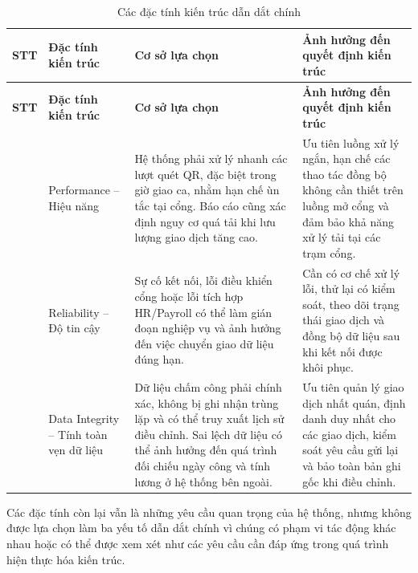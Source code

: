\small
\renewcommand{\arraystretch}{1.3}
\begin{longtable}{|>{\centering\arraybackslash}p{0.7cm}|>{\raggedright\arraybackslash}p{2.6cm}|>{\raggedright\arraybackslash}p{5.8cm}|>{\raggedright\arraybackslash}p{6.0cm}|}
\caption{Các đặc tính kiến trúc dẫn dắt chính}\label{tab:top3} \\
\hline
\textbf{STT} & \textbf{Đặc tính kiến trúc} & \textbf{Cơ sở lựa chọn} & \textbf{Ảnh hưởng đến quyết định kiến trúc} \\
\hline
\endfirsthead
\hline
\textbf{STT} & \textbf{Đặc tính kiến trúc} & \textbf{Cơ sở lựa chọn} & \textbf{Ảnh hưởng đến quyết định kiến trúc} \\
\hline
\endhead
\hline
\endfoot
\hline
\endlastfoot
1 & Performance -- Hiệu năng & Hệ thống phải xử lý nhanh các lượt quét QR, đặc biệt trong giờ giao ca, nhằm hạn chế ùn tắc tại cổng. Báo cáo cũng xác định nguy cơ quá tải khi lưu lượng giao dịch tăng cao. & Ưu tiên luồng xử lý ngắn, hạn chế các thao tác đồng bộ không cần thiết trên luồng mở cổng và đảm bảo khả năng xử lý tải tại các trạm cổng. \\
\hline
2 & Reliability -- Độ tin cậy & Sự cố kết nối, lỗi điều khiển cổng hoặc lỗi tích hợp HR/Payroll có thể làm gián đoạn nghiệp vụ và ảnh hưởng đến việc chuyển giao dữ liệu đúng hạn. & Cần có cơ chế xử lý lỗi, thử lại có kiểm soát, theo dõi trạng thái giao dịch và đồng bộ dữ liệu sau khi kết nối được khôi phục. \\
\hline
3 & Data Integrity -- Tính toàn vẹn dữ liệu & Dữ liệu chấm công phải chính xác, không bị ghi nhận trùng lặp và có thể truy xuất lịch sử điều chỉnh. Sai lệch dữ liệu có thể ảnh hưởng đến quá trình đối chiếu ngày công và tính lương ở hệ thống bên ngoài. & Ưu tiên quản lý giao dịch nhất quán, định danh duy nhất cho các giao dịch, kiểm soát yêu cầu gửi lại và bảo toàn bản ghi gốc khi điều chỉnh. \\
\end{longtable}
\normalsize


Các đặc tính còn lại vẫn là những yêu cầu quan trọng của hệ thống, nhưng không được lựa chọn làm ba yếu tố dẫn dắt chính vì chúng có phạm vi tác động khác nhau hoặc có thể được xem xét như các yêu cầu cần đáp ứng trong quá trình hiện thực hóa kiến trúc.

